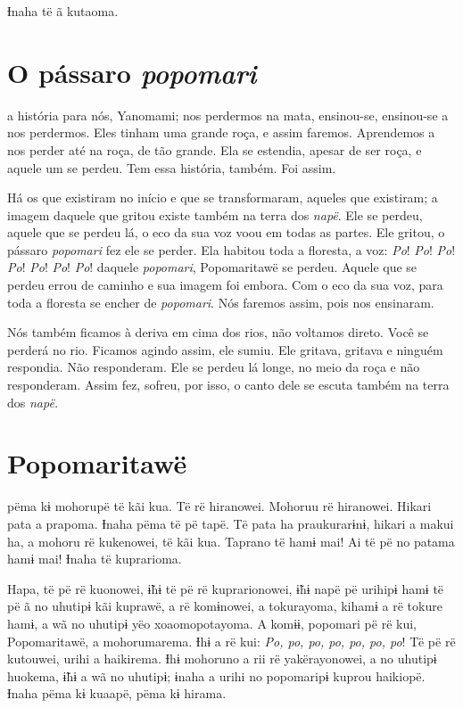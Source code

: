 Ɨnaha të ã kutaoma.

\chapter{O pássaro \textit{popomari}}

 a história para nós, Yanomami; nos perdermos na mata, ensinou-se,
ensinou-se a nos perdermos. Eles tinham uma grande roça, e assim faremos.
Aprendemos a nos perder até na roça, de tão grande. Ela se estendia, apesar
de ser roça, e aquele um se perdeu. Tem essa história, também. Foi assim. 

Há os que existiram no início e que se transformaram, aqueles que
existiram; a imagem daquele que gritou existe também na terra
dos \textit{napë}. Ele se perdeu, aquele que se perdeu lá, o eco da sua
voz voou em todas as partes. Ele gritou, o pássaro \textit{popomari} fez
ele se perder. Ela habitou toda a floresta, a voz: \textit{Po}! \textit{Po}! \textit{Po}! \textit{Po}! \textit{Po}!
\textit{Po}! \textit{Po}! daquele \textit{popomari}, Popomaritawë se perdeu. Aquele que se
perdeu errou de caminho e sua imagem foi embora. Com o eco da sua voz,
para toda a floresta se encher de \textit{popomari}. Nós faremos assim,
pois nos ensinaram. 

Nós também ficamos à deriva em cima dos rios, não voltamos direto. Você se
perderá no rio. Ficamos agindo assim, ele sumiu. Ele gritava, gritava e
ninguém respondia. Não responderam. Ele se perdeu lá longe, no meio da
roça e não responderam. Assim fez, sofreu, por isso, o canto dele se
escuta também na terra dos \textit{napë.}

\chapter{Popomaritawë}
 
 pëma kɨ mohorupë të kãi kua. Të rë hiranowei. Mohoruu rë
hiranowei. Hikari pata a prapoma. Ɨnaha pëma të pë tapë. Të pata ha
praukurarɨnɨ, hikari a makui ha, a mohoru rë kukenowei, të kãi kua.
Taprano të hamɨ mai! Ai të pë no patama hamɨ mai! Ɨnaha të kuprarioma. 

Hapa, të pë rë kuonowei, ɨ̃hɨ të pë rë kuprarionowei, ɨ̃hɨ napë pë urihipɨ
 hamɨ të pë ã no uhutipɨ kãi kuprawë, a rë komɨnowei, a tokurayoma,
 kihamɨ a rë tokure hamɨ, a wã no uhutipɨ yëo xoaomopotayoma. A komɨɨ,
 popomari pë rë kui, Popomaritawë, a mohorumarema. Ɨhɨ a rë kui: \textit{Po, po,
 po, po, po, po, po}! Të pë rë kutouwei, urihi a haikirema. Ɨhɨ mohoruno a
 rii rë yakërayonowei, a no uhutipɨ huokema, ɨ̃hɨ a wã no uhutipɨ; ɨnaha a
 urihi no popomaripɨ kuprou haikiopë. Ɨnaha pëma kɨ kuaapë, pëma kɨ
 hirama. 

